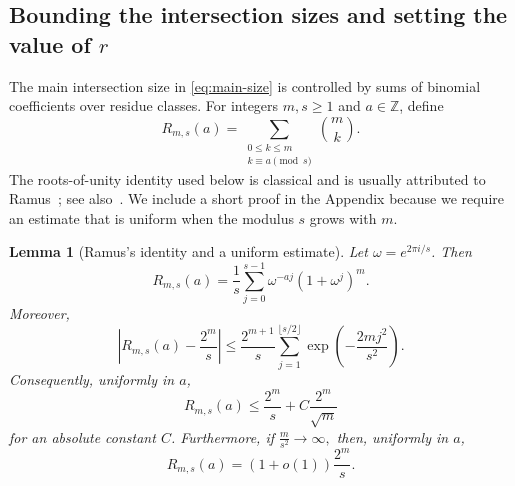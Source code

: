 \documentclass[11pt]{article}
\newtheorem{lemma}[theorem]{Lemma}
\newtheorem{remark}[theorem]{Remark}
\newcommand{\1}{\mathbf{1}}
\begin{document}
	\subsection{Bounding the intersection sizes and setting the value of $r$}\label{sec:residues}
	
	
	The main intersection size in \eqref{eq:main-size} is controlled by sums of
	binomial coefficients over residue classes. For integers \(m,s\geq 1\) and
	\(a\in\mathbb Z\), define
	\[
	R_{m,s}(a)
	=
	\sum_{\substack{0\leq k\leq m\\ k\equiv a\pmod s}}
	\binom{m}{k}.
	\]
	The roots-of-unity identity used below is classical and is usually attributed
	to Ramus~\cite{Ramus1834}; see also~\cite{KonvalinaLiu1997}. We include a
	short proof in the Appendix because we require an estimate that is uniform when the modulus
	\(s\) grows with \(m\).
	
	\begin{lemma}[Ramus's identity and a uniform estimate]
		\label{lem:roots-unity}
		Let \(\omega=e^{2\pi i/s}\). Then
		\begin{equation}
			\label{eq:ramus-identity}
			R_{m,s}(a)
			=
			\frac{1}{s}
			\sum_{j=0}^{s-1}
			\omega^{-aj}(1+\omega^j)^m.
		\end{equation}
		Moreover,
		\begin{equation}
			\label{eq:fourier-error}
			\left|
			R_{m,s}(a)-\frac{2^m}{s}
			\right|
			\leq
			\frac{2^{m+1}}{s}
			\sum_{j=1}^{\lfloor s/2\rfloor}
			\exp\left(-\frac{2mj^2}{s^2}\right).
		\end{equation}
		Consequently, uniformly in \(a\),
		\begin{equation}
			\label{eq:roots-bound}
			R_{m,s}(a)
			\leq
			\frac{2^m}{s}
			+
			C\frac{2^m}{\sqrt m}
		\end{equation}
		for an absolute constant \(C\). Furthermore, if 
		$\frac{m}{s^2}\longrightarrow\infty,$
		then, uniformly in \(a\),
		\begin{equation}
			\label{eq:roots-asymptotic}
			R_{m,s}(a)
			=
			\left(1+o(1)\right)\frac{2^m}{s}.
		\end{equation}
	\end{lemma}
	
	
	
\end{document}
